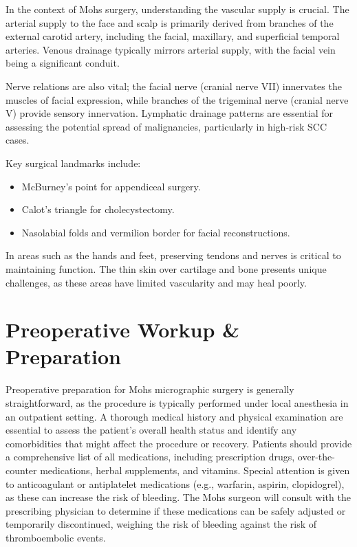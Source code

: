In the context of Mohs surgery, understanding the vascular supply is crucial. The arterial supply to the face and scalp is primarily derived from branches of the external carotid artery, including the facial, maxillary, and superficial temporal arteries. Venous drainage typically mirrors arterial supply, with the facial vein being a significant conduit. 

Nerve relations are also vital; the facial nerve (cranial nerve VII) innervates the muscles of facial expression, while branches of the trigeminal nerve (cranial nerve V) provide sensory innervation. Lymphatic drainage patterns are essential for assessing the potential spread of malignancies, particularly in high-risk SCC cases. 

Key surgical landmarks include:

\begin{itemize}
  \item McBurney's point for appendiceal surgery.
  \item Calot's triangle for cholecystectomy.
  \item Nasolabial folds and vermilion border for facial reconstructions.
\end{itemize}

In areas such as the hands and feet, preserving tendons and nerves is critical to maintaining function. The thin skin over cartilage and bone presents unique challenges, as these areas have limited vascularity and may heal poorly.

\section*{Preoperative Workup \& Preparation}
Preoperative preparation for Mohs micrographic surgery is generally straightforward, as the procedure is typically performed under local anesthesia in an outpatient setting. A thorough medical history and physical examination are essential to assess the patient's overall health status and identify any comorbidities that might affect the procedure or recovery. Patients should provide a comprehensive list of all medications, including prescription drugs, over-the-counter medications, herbal supplements, and vitamins. Special attention is given to anticoagulant or antiplatelet medications (e.g., warfarin, aspirin, clopidogrel), as these can increase the risk of bleeding. The Mohs surgeon will consult with the prescribing physician to determine if these medications can be safely adjusted or temporarily discontinued, weighing the risk of bleeding against the risk of thromboembolic events.

